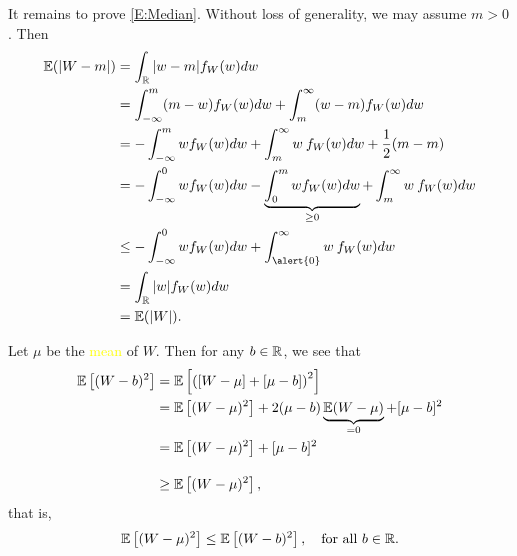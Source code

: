 \begin{frame}[fragile]
\begin{proofnoend}
It remains to prove \eqref{E:Median}. Without loss of generality, we may assume $m>0$. Then
\begin{align*}
  \E(|W-m|) & = \int_\R |w-m|f_W(w)dw \\
            & = \int_{-\infty}^m (m-w)f_W(w)dw + \int_m^\infty(w-m)f_W(w)dw\\
            & = - \int_{-\infty}^m wf_W(w)dw + \int_m^\infty w\: f_W(w)dw + \frac{1}{2}(m-m)\\
            & = - \int_{-\infty}^0 wf_W(w)dw - \underbrace{\int_{0}^m wf_W(w)dw}_{\ge 0}  + \int_m^\infty w\: f_W(w)dw \\
            & \le - \int_{-\infty}^0 wf_W(w)dw   + \int_{\alert{0}}^\infty w\: f_W(w)dw \\
            & = \int_{\R} |w| f_W(w)dw \\
            & = \E(|W|).
  \end{align*}
  \myQED
 \end{proofnoend}
\end{frame}
\begin{frame}[fragile]
  \begin{proofnoend}[ of Part 2. ]
    Let $\mu$ be the \textcolor{yellow}{mean} of  $W$. Then for any $b\in\mathbb{R}$, we see that
     \begin{align*}
      \mathbb{E}\left[(W-b)^2\right] & = \mathbb{E}\left[\left([W-\mu]+[\mu-b]\right)^2\right] \\
                             & = \mathbb{E}\left[(W-\mu )^2\right] + 2 (\mu-b)\underbrace{\mathbb{E}(W-\mu)}_{=0} +[\mu-b]^2 \\
                             & = \mathbb{E}\left[(W-\mu )^2\right] +[\mu-b]^2 \\[1em]
                             & \ge  \mathbb{E}\left[(W-\mu )^2\right],
    \end{align*}
    that is,
\begin{align*}
       \mathbb{E}\left[(W-\mu)^2\right] \le  \mathbb{E}\left[(W-b)^2\right], \quad \text{for all $b\in\mathbb{R}$.}
\end{align*}
    \myQED
  \end{proofnoend}
\end{frame}
